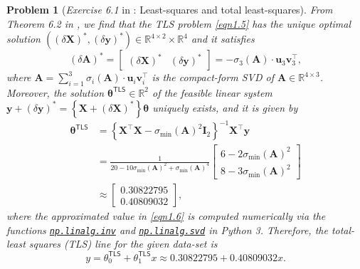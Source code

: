 \documentclass[11pt]{article}
\newtheorem{problem}{Problem}
\numberwithin{equation}{problem}
\begin{document}
\begin{problem} [\emph{Exercise 6.1} in \cite{calafiore2014optimization}: Least-squares and total least-squares]
{\indent From \emph{Theorem 6.2} in \cite{calafiore2014optimization}, we find that the \textsf{TLS} problem \eqref{eqn1.5} has the unique optimal solution $\left( \left( \delta \mathbf{X} \right)^*, \left( \delta \mathbf{y} \right)^* \right) \in \mathbb{R}^{4 \times 2} \times \mathbb{R}^4$ and it satisfies
\begin{equation*}
    \left( \delta \mathbf{A} \right)^* =
    \begin{bmatrix}
        \left( \delta \mathbf{X} \right)^* & \left( \delta \mathbf{y} \right)^*
    \end{bmatrix}
    = - \sigma_3 ( \mathbf{A} ) \cdot \mathbf{u}_3 \mathbf{v}_{3}^{\top},
\end{equation*}
where $\mathbf{A} = \sum_{i=1}^{3} \sigma_i (\mathbf{A}) \cdot \mathbf{u}_i \mathbf{v}_{i}^{\top}$ is the compact-form \textsf{SVD} of $\mathbf{A} \in \mathbb{R}^{4 \times 3}$. Moreover, the solution $\boldsymbol{\theta}^{\textsf{TLS}} \in \mathbb{R}^2$ of the feasible linear system $\mathbf{y} + \left( \delta \mathbf{y} \right)^* = \left\{ \mathbf{X} + \left( \delta \mathbf{X} \right)^* \right\} \boldsymbol{\theta}$ uniquely exists, and it is given by
\begin{equation}
    \label{eqn1.6}
    \begin{split}
        \boldsymbol{\theta}^{\textsf{TLS}} &= \left\{ \mathbf{X}^{\top} \mathbf{X} - \sigma_{\min} (\mathbf{A})^2 \mathbf{I}_2 \right\}^{-1} \mathbf{X}^{\top} \mathbf{y} \\
        &= \frac{1}{20 - 10 \sigma_{\min} (\mathbf{A})^2 + \sigma_{\min} (\mathbf{A})^4}
        \begin{bmatrix}
            6 - 2\sigma_{\min} (\mathbf{A})^2 \\ 8 - 3\sigma_{\min} (\mathbf{A})^2
        \end{bmatrix} \\
        &\approx
        \begin{bmatrix}
            0.30822795 \\ 0.40809032
        \end{bmatrix},
    \end{split}
\end{equation}
where the approximated value in \eqref{eqn1.6} is computed numerically via the functions \href{https://numpy.org/doc/stable/reference/generated/numpy.linalg.inv.html}{\texttt{np.linalg.inv}} and \href{https://numpy.org/doc/stable/reference/generated/numpy.linalg.svd.html}{\texttt{np.linalg.svd}} in Python 3. Therefore, the total-least squares (\textsf{TLS}) line for the given data-set is
\begin{equation}
    \label{eqn1.7}
    y = \theta_{0}^{\textsf{TLS}} + \theta_{1}^{\textsf{TLS}} x
    \approx 0.30822795 + 0.40809032x.
\end{equation}
\medskip

}
\end{problem}
\end{document}
